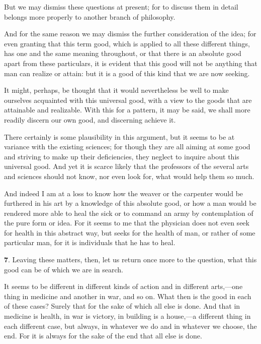 But we may dismiss these questions at present; for to discuss them in
detail belongs more properly to another branch of philosophy.

And for the same reason we may dismiss the  further
consideration of the idea; for even granting that this term good,
which is applied to all these different things, has one and the same
meaning throughout, or that there is an absolute good apart from
these particulars, it is evident that this good will not be anything
that man can realize or attain: but it is a good of this kind that we
are now seeking.

It might, perhaps, be thought that it would nevertheless be well to
make ourselves acquainted with this universal good, with a view to the
goods that are attainable and realizable. With this for a pattern, it
may be said, we shall more readily discern our own good, and
discerning achieve it.

There certainly is some plausibility in this argument, but it seems to
be at variance with the existing sciences; for though they are all
aiming at some good and striving to make up their deficiencies, they
neglect to inquire about this universal good. And yet it is scarce
likely that the professors of the several arts and sciences should not
know, nor even look for, what would help them so much.

And indeed I am at a loss to know how the weaver or the carpenter
would be furthered in his art by a knowledge of this absolute good, or
how a man would be rendered more able to heal the sick or to command
an army by contemplation of the pure form or idea. For it seems to me
that the physician does not even seek for health in this abstract way,
but seeks for the health of man, or rather of some particular man, for
it is individuals that he has to heal.

\textbf{7}. Leaving these matters, then, let us return once 
more to the question, what this good can be of which we are in search.

It seems to be different in different kinds of action and in different
arts,---one thing in medicine and another in war, and so on. What then
is the good in each of these cases? Surely that for the sake of which
all else is done. And that in medicine is health, in war is victory,
in building is a house,---a different thing in each different case,
but always, in whatever we do and in whatever we choose, the end. For
it is always for the sake of the end that all else is done.

